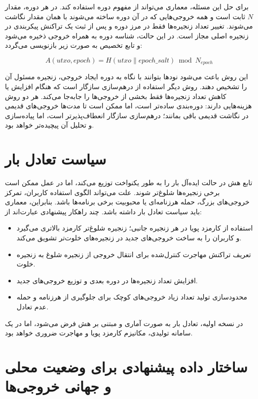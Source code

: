 برای حل این مسئله، معماری می‌تواند از مفهوم دوره استفاده کند. در هر دوره، مقدار \(N\) ثابت است و همه خروجی‌هایی که در آن دوره ساخته می‌شوند با همان مقدار نگاشت می‌شوند. تغییر تعداد زنجیره‌ها فقط در مرز دوره و پس از ثبت یک تراکنش پیکربندی در زنجیره اصلی مجاز است. در این حالت، شناسه دوره به همراه خروجی ذخیره می‌شود و تابع تخصیص به صورت زیر بازنویسی می‌گردد:

\begin{latin}
\[
A(utxo, epoch) = H(utxo \parallel epoch\_salt) \bmod N_{epoch}
\]
\end{latin}

این روش باعث می‌شود نودها بتوانند با نگاه به دوره ایجاد خروجی، زنجیره مسئول آن را تشخیص دهند. روش دیگر استفاده از درهم‌سازی سازگار است که هنگام افزایش یا کاهش تعداد زنجیره‌ها فقط بخشی از خروجی‌ها را جابه‌جا می‌کند. هر دو روش هزینه‌هایی دارند: دوره‌بندی ساده‌تر است، اما ممکن است تا مدت‌ها خروجی‌های قدیمی در نگاشت قدیمی باقی بمانند؛ درهم‌سازی سازگار انعطاف‌پذیرتر است، اما پیاده‌سازی و تحلیل آن پیچیده‌تر خواهد بود.

\section{سیاست تعادل بار}

تابع هش در حالت ایده‌آل بار را به طور یکنواخت توزیع می‌کند، اما در عمل ممکن است برخی زنجیره‌ها شلوغ‌تر شوند. علت می‌تواند الگوی استفاده کاربران، تمرکز خروجی‌های بزرگ، حمله هرزنامه‌ای یا محبوبیت برخی برنامه‌ها باشد. بنابراین، معماری باید سیاست تعادل بار داشته باشد. چند راهکار پیشنهادی عبارت‌اند از:

\begin{itemize}
\item استفاده از کارمزد پویا در هر زنجیره جانبی؛ زنجیره شلوغ‌تر کارمزد بالاتری می‌گیرد و کاربران را به ساخت خروجی‌های جدید در زنجیره‌های خلوت‌تر تشویق می‌کند.
\item تعریف تراکنش مهاجرت کنترل‌شده برای انتقال خروجی از زنجیره شلوغ به زنجیره خلوت.
\item افزایش تعداد زنجیره‌ها در دوره بعدی و توزیع خروجی‌های جدید.
\item محدودسازی تولید تعداد زیاد خروجی‌های کوچک برای جلوگیری از هرزنامه و حمله عدم تعادل.
\end{itemize}

در نسخه اولیه، تعادل بار به صورت آماری و مبتنی بر هش فرض می‌شود، اما در یک سامانه تولیدی، مکانیزم کارمزد پویا و مهاجرت ضروری خواهد بود.

\section{ساختار داده پیشنهادی برای وضعیت محلی و جهانی خروجی‌ها}

